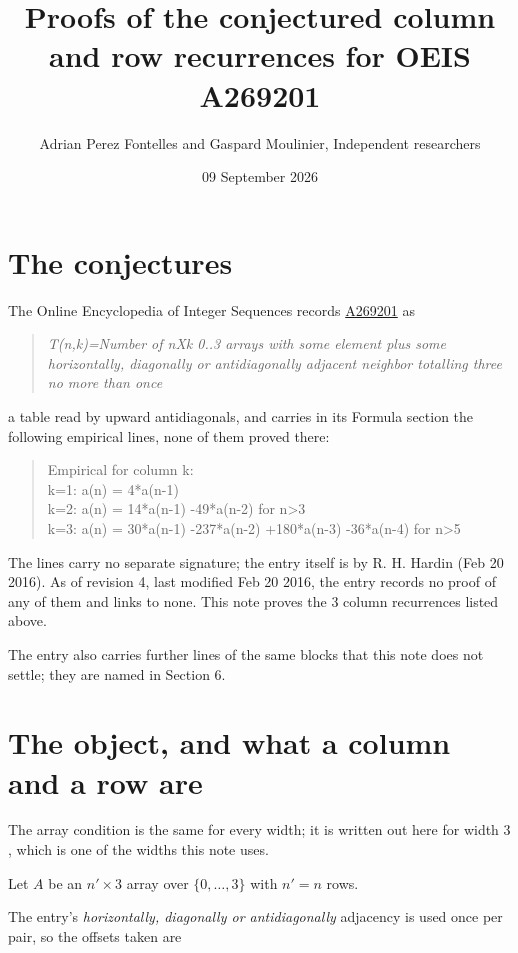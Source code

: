\documentclass[11pt]{article}
\title{Proofs of the conjectured column and row recurrences for OEIS A269201}
\author{Adrian Perez Fontelles and Gaspard Moulinier, Independent researchers}
\date{09 September 2026}
\theoremstyle{definition}
\begin{document}
\maketitle
\section{The conjectures}

The Online Encyclopedia of Integer Sequences records \href{https://oeis.org/A269201}{A269201} as

\begin{quote}\itshape T(n,k)=Number of nXk 0..3 arrays with some element plus some horizontally, diagonally or antidiagonally adjacent neighbor totalling three no more than once\end{quote}

a table read by upward antidiagonals, and carries in its Formula section the following empirical lines, none of them proved there:

\begin{quote}\ttfamily Empirical for column k:\\
k=1: a(n) = 4*a(n-1)\\k=2: a(n) = 14*a(n-1) -49*a(n-2) for n>3\\k=3: a(n) = 30*a(n-1) -237*a(n-2) +180*a(n-3) -36*a(n-4) for n>5\end{quote}

The lines carry no separate signature; the entry itself is by R. H. Hardin (Feb 20 2016). As of revision 4, last modified Feb 20 2016, the entry records no proof of any of them and links to none. This note proves the 3 column recurrences listed above.

The entry also carries further lines of the same blocks that this note does not settle; they are named in Section 6.

\section{The object, and what a column and a row are}

The array condition is the same for every width; it is written out here for width $3$, which is one of the widths this note uses.

Let $A$ be an $n' \times 3$ array over $\{0,\dots,3\}$ with $n' = n$ rows.

The entry's {\itshape horizontally, diagonally or antidiagonally} adjacency is used once per pair, so the offsets taken are
\end{document}
